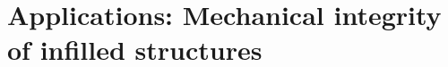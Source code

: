 \chapter{Applications: Mechanical integrity of infilled structures}\label{ch:infill}



\cleardoublepage

